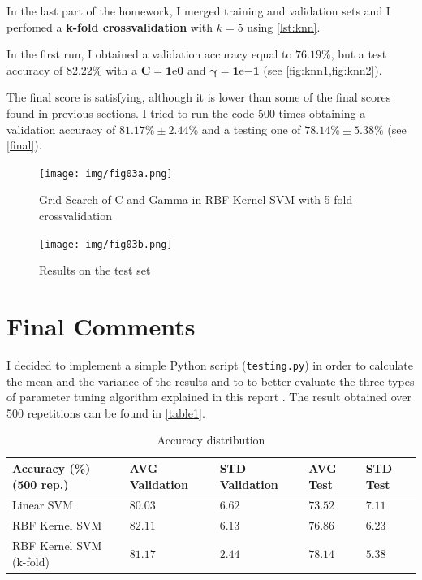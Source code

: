 \documentclass[a4paper, 11pt]{article}
\begin{document}
	In the last part of the homework, I merged training and validation sets and I perfomed a \textbf{k-fold crossvalidation} with $k=5$ using \vref{lst:knn}.
	
	
	
	In the first run, I obtained a validation accuracy equal to $76.19\%$, but a test accuracy of $82.22\%$ with a $\boldsymbol{C=1\mathrm{e}{0}}$ and $\boldsymbol{\gamma=1\mathrm{e}{-1}}$ (see \vref{fig:knn1,fig:knn2}).
	
	The final score is satisfying, although it is lower than some of the final scores found in previous sections. I tried to run the code $500$ times obtaining a validation accuracy of $\boldsymbol{81.17\%\pm2.44\%}$ and a testing one of $\boldsymbol{78.14\%\pm5.38\%}$  (see \vref{final}).
	
	\begin{figure}[ht!]
		\centering
		\texttt{[image: img/fig03a.png]}
		\caption{Grid Search of C and Gamma in RBF Kernel SVM with 5-fold crossvalidation}
		\label{fig:knn1}
	\end{figure}
	
	\begin{figure}[ht!]
		\centering
		\texttt{[image: img/fig03b.png]}
		\caption{Results on the test set}
		\label{fig:knn2}
	\end{figure}

	\section{Final Comments} \label{final}
	
	I decided to implement a simple Python script (\texttt{testing.py}) in order to calculate the mean and the variance of the results and to to better evaluate the three types of parameter tuning algorithm explained in this report .
	The result obtained over 500 repetitions can be found in \vref{table1}.

	\begin{table}[!h]
		\centering
		\caption{Accuracy distribution}
		\label{table1}
		\begin{tabular}{@{}lllll@{}}
			\toprule
			\textbf{Accuracy (\%)} (500 rep.)		& AVG Validation	& STD Validation	& AVG Test		& STD Test \\ \midrule
			Linear SVM				& $80.03$	 	&  $6.62$		& $73.52$ & $7.11$ \\
			RBF Kernel SVM			& $82.11$	 	&  $6.13$		& $76.86$ & $6.23$ \\
			RBF Kernel SVM (k-fold)	& $81.17$	 	&  $2.44$		& $78.14$ & $5.38$ \\ \bottomrule
		\end{tabular}
	\end{table}
\end{document}
